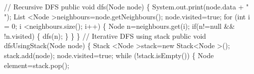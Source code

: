 \documentclass{report}
\begin{document}
	// Recursive DFS\newline
	public  void dfs(Node node)\newline
	\{\newline
    	\hspace*{0.8cm}System.out.print(node.data + " ");\newline
		\hspace*{0.8cm}List \textless Node \textgreater neighbours=node.getNeighbours();\newline
        \hspace*{0.8cm}node.visited=true;\newline
		\hspace*{0.8cm}for (int i = 0; i \textless neighbours.size(); i++) \{\newline
			\hspace*{1cm}Node n=neighbours.get(i);\newline
			\hspace*{1cm}if(n!=null \&\&  !n.visited)\newline
			\hspace*{1cm}\{\newline
				\hspace*{1.5cm}dfs(n);\newline
			\hspace*{1cm}\}\newline
		\hspace*{0.8cm}\}\newline
	\}\newline
 \newline
	// Iterative DFS using stack\newline
	public  void dfsUsingStack(Node node)\newline
	\{\newline
		\hspace*{0.8cm}Stack \textless Node \textgreater stack=new  Stack\textless Node \textgreater ();\newline
		\hspace*{0.8cm}stack.add(node);\newline
		\hspace*{0.8cm}node.visited=true;\newline
		\hspace*{0.8cm}while (!stack.isEmpty())\newline
		\hspace*{0.8cm}\{\newline
			\hspace*{1cm}Node element=stack.pop();\newline
\end{document}
